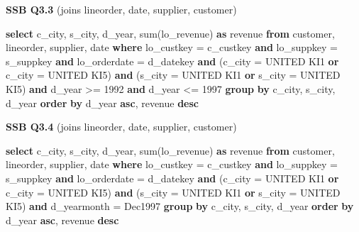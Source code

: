 \documentclass[
]{article}
\newenvironment{Shaded}{}{}
\newcommand{\DataTypeTok}[1]{\textcolor[rgb]{0.56,0.13,0.00}{#1}}
\newcommand{\DecValTok}[1]{\textcolor[rgb]{0.25,0.63,0.44}{#1}}
\newcommand{\FunctionTok}[1]{\textcolor[rgb]{0.02,0.16,0.49}{#1}}
\newcommand{\KeywordTok}[1]{\textcolor[rgb]{0.00,0.44,0.13}{\textbf{#1}}}
\newcommand{\NormalTok}[1]{#1}
\newcommand{\OperatorTok}[1]{\textcolor[rgb]{0.40,0.40,0.40}{#1}}
\newcommand{\StringTok}[1]{\textcolor[rgb]{0.25,0.44,0.63}{#1}}
\begin{document}
\textbf{SSB Q3.3} (joins lineorder, date, supplier, customer)

\begin{Shaded}
\begin{Highlighting}[]
\KeywordTok{select}\NormalTok{ c\_city, s\_city, d\_year, }\FunctionTok{sum}\NormalTok{(lo\_revenue) }\KeywordTok{as}\NormalTok{ revenue}
\KeywordTok{from}\NormalTok{ customer, lineorder, supplier, }\DataTypeTok{date}
\KeywordTok{where}\NormalTok{ lo\_custkey }\OperatorTok{=}\NormalTok{ c\_custkey }\KeywordTok{and}\NormalTok{ lo\_suppkey }\OperatorTok{=}\NormalTok{ s\_suppkey }\KeywordTok{and}\NormalTok{ lo\_orderdate }\OperatorTok{=}\NormalTok{ d\_datekey }\KeywordTok{and}\NormalTok{ (c\_city }\OperatorTok{=} \StringTok{\textquotesingle{}UNITED KI1\textquotesingle{}} \KeywordTok{or}\NormalTok{ c\_city }\OperatorTok{=} \StringTok{\textquotesingle{}UNITED KI5\textquotesingle{}}\NormalTok{) }\KeywordTok{and}\NormalTok{ (s\_city }\OperatorTok{=} \StringTok{\textquotesingle{}UNITED KI1\textquotesingle{}} \KeywordTok{or}\NormalTok{ s\_city }\OperatorTok{=} \StringTok{\textquotesingle{}UNITED KI5\textquotesingle{}}\NormalTok{) }\KeywordTok{and}\NormalTok{ d\_year }\OperatorTok{\textgreater{}=} \DecValTok{1992} \KeywordTok{and}\NormalTok{ d\_year }\OperatorTok{\textless{}=} \DecValTok{1997}
\KeywordTok{group} \KeywordTok{by}\NormalTok{ c\_city, s\_city, d\_year}
\KeywordTok{order} \KeywordTok{by}\NormalTok{ d\_year }\KeywordTok{asc}\NormalTok{, revenue }\KeywordTok{desc}
\end{Highlighting}
\end{Shaded}

\textbf{SSB Q3.4} (joins lineorder, date, supplier, customer)

\begin{Shaded}
\begin{Highlighting}[]
\KeywordTok{select}\NormalTok{ c\_city, s\_city, d\_year, }\FunctionTok{sum}\NormalTok{(lo\_revenue) }\KeywordTok{as}\NormalTok{ revenue}
\KeywordTok{from}\NormalTok{ customer, lineorder, supplier, }\DataTypeTok{date}
\KeywordTok{where}\NormalTok{ lo\_custkey }\OperatorTok{=}\NormalTok{ c\_custkey }\KeywordTok{and}\NormalTok{ lo\_suppkey }\OperatorTok{=}\NormalTok{ s\_suppkey }\KeywordTok{and}\NormalTok{ lo\_orderdate }\OperatorTok{=}\NormalTok{ d\_datekey }\KeywordTok{and}\NormalTok{ (c\_city }\OperatorTok{=} \StringTok{\textquotesingle{}UNITED KI1\textquotesingle{}} \KeywordTok{or}\NormalTok{ c\_city }\OperatorTok{=} \StringTok{\textquotesingle{}UNITED KI5\textquotesingle{}}\NormalTok{) }\KeywordTok{and}\NormalTok{ (s\_city }\OperatorTok{=} \StringTok{\textquotesingle{}UNITED KI1\textquotesingle{}} \KeywordTok{or}\NormalTok{ s\_city }\OperatorTok{=} \StringTok{\textquotesingle{}UNITED KI5\textquotesingle{}}\NormalTok{) }\KeywordTok{and}\NormalTok{ d\_yearmonth }\OperatorTok{=} \StringTok{\textquotesingle{}Dec1997\textquotesingle{}}
\KeywordTok{group} \KeywordTok{by}\NormalTok{ c\_city, s\_city, d\_year}
\KeywordTok{order} \KeywordTok{by}\NormalTok{ d\_year }\KeywordTok{asc}\NormalTok{, revenue }\KeywordTok{desc}
\end{Highlighting}
\end{Shaded}
\end{document}
